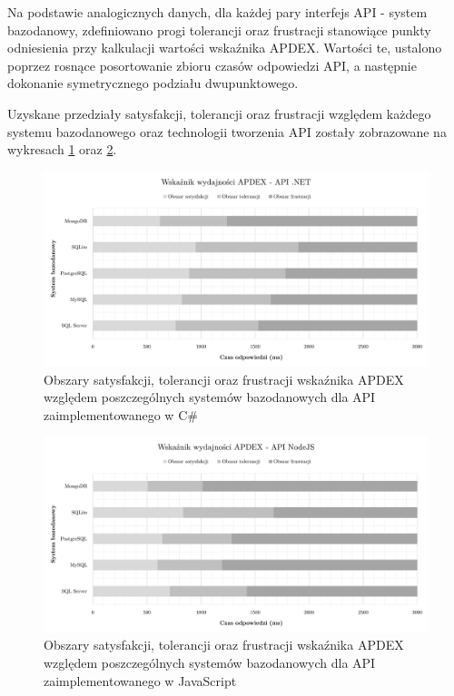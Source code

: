 Na podstawie analogicznych danych, dla każdej pary interfejs API - system bazodanowy, zdefiniowano progi tolerancji oraz frustracji stanowiące punkty odniesienia przy kalkulacji wartości wskaźnika APDEX. Wartości te, ustalono poprzez rosnące posortowanie zbioru czasów odpowiedzi API, a następnie dokonanie symetrycznego podziału dwupunktowego.

Uzyskane przedziały satysfakcji, tolerancji oraz frustracji względem każdego systemu bazodanowego oraz technologii tworzenia API zostały zobrazowane na wykresach \ref{fig:apdex-dotnet} oraz \ref{fig:apdex-nodejs}.

\begin{figure}[htb]
    \centering
     \includegraphics[width=\linewidth]{rys05/apdex-dotnet.pdf}
    \caption{Obszary satysfakcji, tolerancji oraz frustracji wskaźnika APDEX względem poszczególnych systemów bazodanowych dla API zaimplementowanego w C\#}
    \label{fig:apdex-dotnet}
\end{figure}

\clearpage

\begin{figure}[htb]
    \centering
     \includegraphics[width=\linewidth]{rys05/apdex-nodejs.pdf}
    \caption{Obszary satysfakcji, tolerancji oraz frustracji wskaźnika APDEX względem poszczególnych systemów bazodanowych dla API zaimplementowanego w JavaScript}
    \label{fig:apdex-nodejs}
\end{figure}

